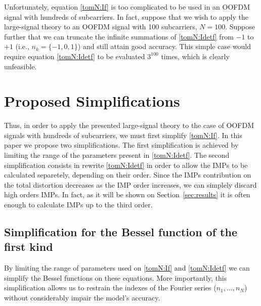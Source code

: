 \documentclass[journal]{IEEEtran}
\begin{document}
Unfortunately, equation \eqref{tomN:If} is too complicated to be used in an OOFDM signal with hundreds of subcarriers. In fact, suppose that we wish to apply the large-signal theory to an OOFDM signal with 100 subcarriers, $N = 100$. Suppose further that we can truncate the infinite summations of \eqref{tomN:Idetf} from $-1$ to $+1$ (i.e., $n_k = \{-1,0,1\}$) and still attain good accuracy. This simple case would require equation \eqref{tomN:Idetf} to be evaluated $3^{100}$ times, which is clearly unfeasible.
\section{Proposed Simplifications} \label{sec:simpl}
Thus, in order to apply the presented large-signal theory to the case of OOFDM signals with hundreds of subcarriers, we must first simplify \eqref{tomN:If}. In this paper we propose two simplifications. The first simplification is achieved by limiting the range of the parameters present in \eqref{tomN:Idetf}. The second simplification consists in rewrite \eqref{tomN:Idetf} in order to allow the IMPs to be calculated separetely, depending on their order. Since the IMPs contribution on the total distortion decreases as the IMP order increases, we can simplely discard high orders IMPs. In fact, as it will be shown on Section~\ref{sec:results} it is often enough to calculate IMPs up to the third order.

\subsection{Simplification for the Bessel function of the first kind}
By limiting the range of parameters used on \eqref{tomN:If} and \eqref{tomN:Idetf} we can simplify the Bessel functions on these equations. More importantly, this simplification allows us to restrain the indexes of the Fourier series ($n_1,\ldots, n_N$) without considerably impair the model's accuracy.
\end{document}
